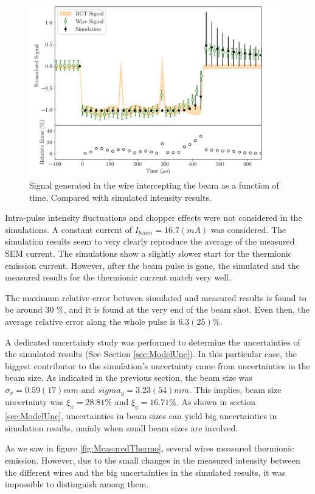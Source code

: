 \begin{figure}[h]
    \centering
    \includegraphics[width=0.75\columnwidth]{Figure_MeasurementSimulationCompa/VerticalCompa.pdf}
    \caption{Signal generated in the wire intercepting the beam as a function of time. Compared with simulated intensity results. }
    \label{fig:MeasSimCompa}
\end{figure}

Intra-pulse intensity fluctuations and chopper effects were not considered in the simulations. A constant current of $I_{beam} = 16.7 (mA)$ was considered. The simulation results seem to very clearly reproduce the average of the measured SEM current. The simulations show a slightly slower start for the thermionic emission current. However, after the beam pulse is gone, the simulated and the measured results for the thermionic current match very well. 

The maximum relative error between simulated and measured results is found to be around 30 $\%$, and it is found at the very end of the beam shot. Even then, the average relative error along the whole pulse is $6.3(25) \%$. 

A dedicated uncertainty study was performed to determine the uncertainties of the simulated results (See Section \ref{sec:ModelUnc}). In this particular case, the biggest contributor to the simulation's uncertainty came from uncertainties in the beam size. As indicated in the previous section, the beam size was $\sigma_x = 0.59(17) mm$ and $sigma_y = 3.23(54) mm$. This implies, beam size uncertainty was $\xi_x = 28.81 \%$ and $\xi_y = 16.71 \%$. As shown in section \ref{sec:ModelUnc}, uncertainties in beam sizes can yield big uncertainties in simulation results, mainly when small beam sizes are involved. 

As we saw in figure \ref{fig:MeasuredThermo}, several wires measured thermionic emission. However, due to the small changes in the measured intensity between the different wires and the big uncertainties in the simulated results, it was impossible to distinguish among them. 



